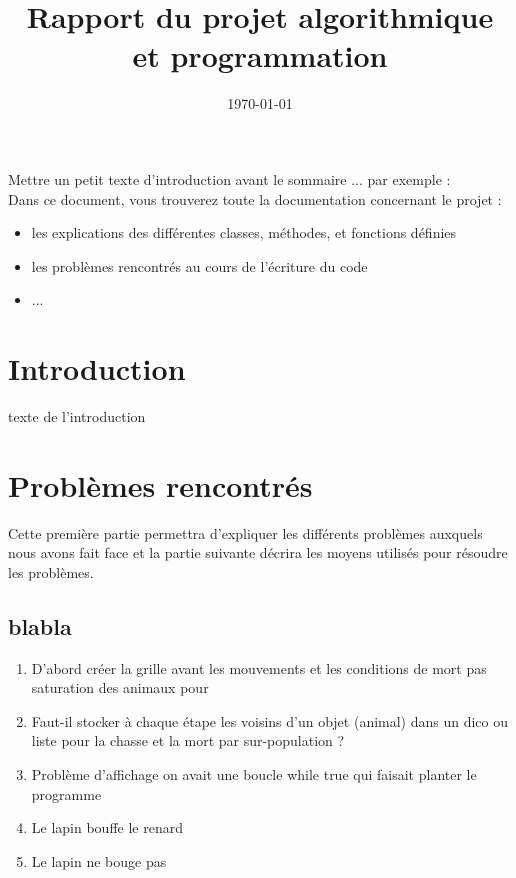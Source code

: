 \documentclass[a4paper]{article}
\date{\today}
\author{\bsc{DUPUY-\--CORTI Clara} \and \bsc{PELTZER Léon}}
\title{Rapport du projet algorithmique et programmation}
\begin{document}
{\large
\maketitle      

Mettre un petit texte d'introduction avant le sommaire ... par exemple :
\\
Dans ce document, vous trouverez toute la documentation concernant le projet :
\begin{itemize}
\item les explications des différentes classes, méthodes, et fonctions définies
\item les problèmes rencontrés au cours de l'écriture du code
\item ...
\end{itemize}


\tableofcontents

\newpage

   \section*{Introduction}
      texte de l’introduction

   \section{Problèmes rencontrés}
      Cette première partie permettra d'expliquer les différents problèmes auxquels nous avons fait face et la partie suivante décrira les moyens utilisés pour résoudre les problèmes.
      \subsection{blabla}
    \begin{enumerate}
   
\item D'abord créer la grille avant les mouvements et les conditions de mort pas saturation des animaux pour 

\item Faut-il stocker à chaque étape les voisins d'un objet (animal) dans un dico ou liste pour la chasse et la mort par sur-population ?

\item Problème d'affichage on avait une boucle while true qui faisait planter le programme
\item Le lapin bouffe le renard

\item Le lapin ne bouge pas


\end{enumerate}}
\end{document}
